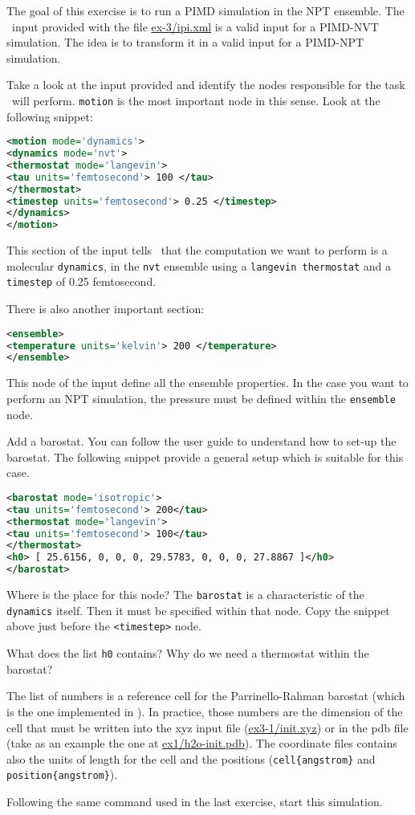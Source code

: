 \documentclass{article}
\begin{document}
\begin{Exercise}[label={inputs},title={PIMD-NPT simulation of ice}]
The goal of this exercise is to run a PIMD simulation in the NPT
ensemble. The \ipi\ input provided with the file \url{ex-3/ipi.xml} is
a valid input for a PIMD-NVT simulation. The idea is to transform it
in a valid input for a PIMD-NPT simulation.

\Question
Take a look at the input provided and identify the nodes responsible
for the task \ipi\ will perform.
\texttt{motion} is the most important node in this sense.
Look at the following snippet:
\begin{lstlisting}[language=xml]
<motion mode='dynamics'>
<dynamics mode='nvt'>
<thermostat mode='langevin'>
<tau units='femtosecond'> 100 </tau>
</thermostat>
<timestep units='femtosecond'> 0.25 </timestep>
</dynamics>
</motion>
\end{lstlisting}
This section of the input tells \ipi\ that the computation we want to
perform is a molecular \texttt{dynamics}, in the \texttt{nvt} ensemble
using a \texttt{langevin thermostat} and a \texttt{timestep} of 0.25
femtosecond. 

There is also another important section:
\begin{lstlisting}[language=xml]
<ensemble>
<temperature units='kelvin'> 200 </temperature>
</ensemble>
\end{lstlisting}
This node of the input define all the ensemble properties. In the
case you want to perform an NPT simulation, the pressure must be
defined within the \texttt{ensemble} node.


\Question
Add a barostat. You can follow the user guide to understand how to
set-up the barostat. The following snippet provide a general setup
which is suitable for this case.
\begin{lstlisting}[language=xml]
<barostat mode='isotropic'>
<tau units='femtosecond'> 200</tau>
<thermostat mode='langevin'>
<tau units='femtosecond'> 100</tau>
</thermostat>
<h0> [ 25.6156, 0, 0, 0, 29.5783, 0, 0, 0, 27.8867 ]</h0>
</barostat>
\end{lstlisting}
Where is the place for this node? The \texttt{barostat} is a
characteristic of the \texttt{dynamics} itself. Then it must be
specified within that node. Copy the snippet above just before the
\texttt{<timestep>} node.
      
\Question
What does the list \texttt{h0} contains? Why do we need a thermostat
within the barostat? 

The list of numbers is a reference cell for the Parrinello-Rahman
barostat (which is the one implemented in \ipi). In practice, those
numbers are the dimension of the cell that must be written into the xyz
input file (\url{ex3-1/init.xyz}) or in the pdb file (take as an
example the one at \url{ex1/h2o-init.pdb}). The coordinate files
contains also the units of length for the cell and the positions
(\texttt{cell\{angstrom\}} and \texttt{position\{angstrom\}}).

\Question
Following the same command used in the last exercise, start this
simulation.

\end{Exercise}
\end{document}
